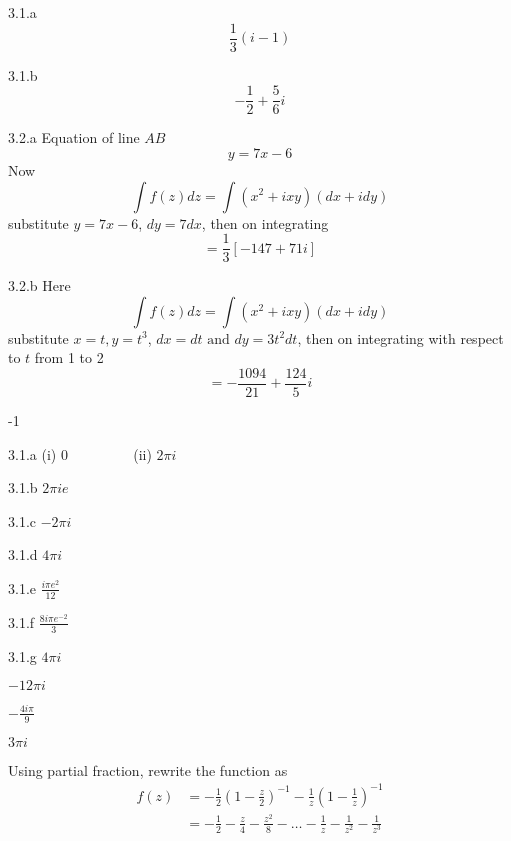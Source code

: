 \begin{Solution}{3.1.a}
\[\frac{1}{3}(i-1)\]
\end{Solution}
\begin{Solution}{3.1.b}
\[-\frac{1}{2}+\frac{5}{6}i\]
\end{Solution}
\begin{Solution}{3.2.a}
Equation of line $AB$
\[y=7x-6\]
Now
\[\int f(z) dz  = \int (x^2 + ixy)(dx+idy)\]
substitute $y=7x-6$, $dy=7dx$, then on integrating
\[=\frac{1}{3}[-147+71i]\]
\end{Solution}
\begin{Solution}{3.2.b}
Here
\[\int f(z) dz  = \int (x^2 + ixy)(dx+idy)\]
substitute $x=t,y=t^3$, $dx=dt\text{ and } dy=3t^2dt$, then on integrating with respect to $t$ from 1 to 2
\[=-\frac{1094}{21}+\frac{124}{5}i\]
\end{Solution}
\begin{Solution}{3.3}
-1
\end{Solution}
\begin{Solution}{3.1.a}
(i) 0	~~~~~~~~ (ii) $2\pi i$
\end{Solution}
\begin{Solution}{3.1.b}
$2\pi i e$
\end{Solution}
\begin{Solution}{3.1.c}
$-2\pi i$
\end{Solution}
\begin{Solution}{3.1.d}
$4\pi i $
\end{Solution}
\begin{Solution}{3.1.e}
$\frac{i\pi e^2}{12}$
\end{Solution}
\begin{Solution}{3.1.f}
$\frac{8 i \pi e^{-2}}{3}$
\end{Solution}
\begin{Solution}{3.1.g}
$4 \pi i$
\end{Solution}
\begin{Solution}{3.2}
$-12 \pi i$
\end{Solution}
\begin{Solution}{3.3}
$-\frac{4i\pi}{9}$
\end{Solution}
\begin{Solution}{3.4}
$3\pi i$
\end{Solution}
\begin{Solution}{3.1}
Using partial fraction, rewrite the function as
\begin{align*}
f(z) & =-\frac{1}{2}\left(1-\frac{z}{2}\right)^{-1}-\frac{1}{z}\left(1-\frac{1}{z}\right)^{-1}\\
 & =-\frac{1}{2}-\frac{z}{4}-\frac{z^{2}}{8}-\ldots-\frac{1}{z}-\frac{1}{z^{2}}-\frac{1}{z^{3}}
 \end{align*}
\end{Solution}
